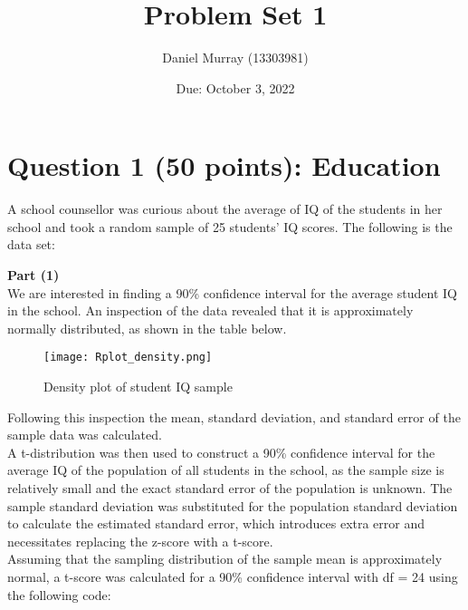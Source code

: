 \documentclass[12pt,letterpaper]{article}
\title{Problem Set 1}
\date{Due: October 3, 2022}
\author{Daniel Murray (13303981)}
\begin{document}
	\maketitle
	
	\section*{Question 1 (50 points): Education}

A school counsellor was curious about the average of IQ of the students in her school and took a random sample of 25 students' IQ scores. The following is the data set:\\
\vspace{.25cm}

  

\vspace{.5cm}

\noindent \textbf{Part (1)}\\

We are interested in finding a 90\% confidence interval for the average student IQ in the school. An inspection of the data revealed that it is approximately normally distributed, as shown in the table below.\\

	\begin{figure}[H]\centering
	\caption{\footnotesize Density plot of student IQ sample}
	\texttt{[image: Rplot\_density.png]}
\end{figure} 

Following this inspection the mean, standard deviation, and standard error of the sample data was calculated.\\

A t-distribution was then used to construct a 90\% confidence interval for the average IQ of the population of all students in the school, as the sample size is relatively small and the exact standard error of the population is unknown. The sample standard deviation was substituted for the population standard deviation to calculate the estimated standard error, which introduces extra error and necessitates replacing the z-score with a t-score.\\

Assuming that the sampling distribution of the sample mean is approximately normal, a t-score was calculated for a 90\% confidence interval with df = 24 using the following code:

\vspace{.5cm}
\end{document}
